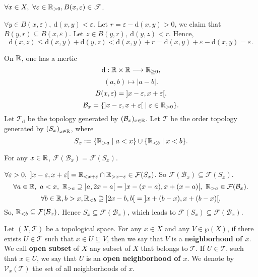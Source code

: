 \begin{propositionenv}
    $\forall x\in X,\ \forall \varepsilon\in \mathbb{R}_{>0}, B(x,\varepsilon)\in \mathscr{T}$.
\end{propositionenv}
\begin{proofenv}
    $\forall y\in B(x,\varepsilon),\ \mathrm{d}(x,y)<\varepsilon$. Let $r=\varepsilon-\mathrm{d}(x,y)>0$, we claim that $B(y,r)\subseteq B(x,\varepsilon)$. Let $z\in B(y,r), \ \mathrm{d}(y,z)<r$. Hence,
    $$\mathrm{d}(x,z)\le \mathrm{d}(x,y)+\mathrm{d}(y,z)<\mathrm{d}(x,y)+r=\mathrm{d}(x,y)+\varepsilon -\mathrm{d}(x,y)=\varepsilon.$$
\end{proofenv}
\begin{remark}
    On $\mathbb{R}$, one has a mertic 
    $$\mathrm{d}: \mathbb{R}\times \mathbb{R}\longrightarrow \mathbb{R}_{\ge 0},$$
    $$\left(a,b\right)\longmapsto |a-b|.$$
    $$B(x,\varepsilon)=\interval[open]{x-\varepsilon}{x+\varepsilon}.$$
    $$\mathcal{B}_x=\{\interval[open]{x-\varepsilon}{x+\varepsilon}\mid \varepsilon\in \RR_{>0}\}.$$
    Let $\mathscr{T}_\mathrm{d}$ be the topology generated by $(\mathcal{B}_x)_{x\in \mathbb{R}}$. Let $\mathscr{T}$ be the order topology generated by $\left(S_x\right)_{x\in \mathbb{R}}$, where 
    $$S_x:=\{\mathbb{R}_{>a}\mid a<x\}\cup \{\mathbb{R}_{<b}\mid x<b\}.$$
\end{remark}
\begin{propositionenv}
    For any $x\in \mathbb{R}$, $\mathcal{F}(\mathcal{B}_x)=\mathcal{F}(S_x)$.
\end{propositionenv}
\begin{proofenv}
    $\forall \varepsilon>0,\ \interval[open]{x-\varepsilon}{x+\varepsilon}=\RR_{<x+\varepsilon}\cap \RR_{>x-\varepsilon}\in \mathcal{F}(S_x)$. So $\mathcal{F}(\mathcal{B}_x)\subseteq \mathcal{F}(S_x)$.
    $$\forall a\in \RR,\ a<x,\ \RR_{>a}\supseteq \interval[open]{a}{2x-a}=\interval[open]{x-(x-a)}{x+(x-a)},\ \RR_{>a}\in \mathcal{F}(\mathcal{B}_x).$$
    $$\forall b\in \RR, b>x,\RR_{<b}\supseteq \interval[open]{2x-b}{b}=\interval[open]{x+(b-x)}{x+(b-x)},$$
    So, $\mathbb{R}_{<b}\subseteq\mathcal{F}(\mathcal{B}_x)$. Hence $S_x\subseteq \mathcal{F}(\mathcal{B}_x)$, which leads to $\mathcal{F}(S_x)\subseteq\mathcal{F}(\mathcal{B}_x)$.
\end{proofenv}
\begin{definitionenv}
    Let $(X,\mathscr{T})$ be a topological space. For any $x\in X$ and any $V\in \wp(X)$, if there exists $U\in \mathscr{T}$ such that $x\in U\subseteq V$, then we say that $V$ is a \textbf{neighborhood of $x$}. We call \textbf{open subset} of $X$ any subset of $X$ that belongs to $\mathscr{T}$. If $U\in \mathscr{T}$, such that $x\in U$, we say that $U$ is an \textbf{open neighborhood of $x$}. We denote by $\mathcal{V}_x(\mathscr{T})$ the set of all neighborhoods of $x$.
\end{definitionenv}
